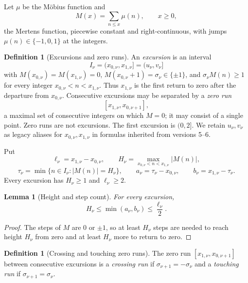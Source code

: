 \documentclass[11pt]{amsart}
\numberwithin{equation}{section}
\theoremstyle{plain}
\newtheorem{lemma}[theorem]{Lemma}
\theoremstyle{definition}
\newtheorem{definition}[theorem]{Definition}
\theoremstyle{remark}
\begin{document}
\medskip

Let $\mu$ be the M\"obius function and
\begin{equation}
\label{eq:mertens_def}
M(x)=\sum_{n\le x}\mu(n),\qquad x\ge0,
\end{equation}
the Mertens function, piecewise constant and right-continuous, with jumps
$\mu(n)\in\{-1,0,1\}$ at the integers.

\begin{definition}[Excursions and zero runs]
\label{def:excursion}
An \emph{excursion} is an interval
\[
I_\nu=(x_{0,\nu},x_{1,\nu}]=(u_\nu,v_\nu]
\]
with $M(x_{0,\nu})=M(x_{1,\nu})=0$,
$M(x_{0,\nu}+1)=\sigma_\nu\in\{\pm1\}$, and
$\sigma_\nu M(n)\ge1$ for every integer
$x_{0,\nu}<n<x_{1,\nu}$. Thus $x_{1,\nu}$ is the first return to zero after
the departure from $x_{0,\nu}$. Consecutive excursions may be separated by
a \emph{zero run}
\[
[x_{1,\nu},x_{0,\nu+1}],
\]
a maximal set of consecutive integers on which $M=0$; it may consist of a
single point. Zero runs are not excursions. The first excursion is $(0,2]$.
We retain $u_\nu,v_\nu$ as legacy aliases for $x_{0,\nu},x_{1,\nu}$ in
formulas inherited from versions 5--6.

Put
\[
\ell_\nu=x_{1,\nu}-x_{0,\nu},\qquad
H_\nu=\max_{x_{0,\nu}<n<x_{1,\nu}}|M(n)|,
\]
\[
\tau_\nu=\min\{n\in I_\nu:|M(n)|=H_\nu\},\qquad
a_\nu=\tau_\nu-x_{0,\nu},\qquad b_\nu=x_{1,\nu}-\tau_\nu.
\]
Every excursion has $H_\nu\ge1$ and $\ell_\nu\ge2$.
\end{definition}

\begin{lemma}[Height and step count]
\label{lem:height_steps}
For every excursion,
\begin{equation}
\label{eq:height_steps}
H_\nu\le\min(a_\nu,b_\nu)\le\frac{\ell_\nu}{2}.
\end{equation}
\end{lemma}

\begin{proof}
The steps of $M$ are $0$ or $\pm1$, so at least $H_\nu$ steps are needed to
reach height $H_\nu$ from zero and at least $H_\nu$ more to return to zero.
\end{proof}

\begin{definition}[Crossing and touching zero runs]
\label{def:crossing_touching}
The zero run $[x_{1,\nu},x_{0,\nu+1}]$ between consecutive excursions is a
\emph{crossing run} if $\sigma_{\nu+1}=-\sigma_\nu$ and a \emph{touching run}
if $\sigma_{\nu+1}=\sigma_\nu$.
\end{definition}
\end{document}
